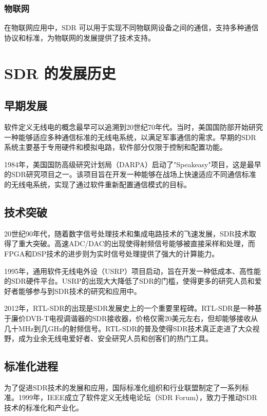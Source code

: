 ﻿\documentclass[UTF8]{ctexbook}
\begin{document}
\subsubsection{物联网}
在物联网应用中，SDR 可以用于实现不同物联网设备之间的通信，支持多种通信协议和标准，为物联网的发展提供了技术支持。
\section{SDR 的发展历史}

\subsection{早期发展}

软件定义无线电的概念最早可以追溯到20世纪70年代。当时，美国国防部开始研究一种能够适应多种通信标准的无线电系统，以满足军事通信的需求。早期的SDR系统主要基于专用硬件和模拟电路，软件部分仅限于控制和配置功能。

1984年，美国国防高级研究计划局（DARPA）启动了"Speakeasy"项目，这是最早的SDR研究项目之一。该项目旨在开发一种能够在战场上快速适应不同通信标准的无线电系统，实现了通过软件重新配置通信模式的目标。

\subsection{技术突破}

20世纪90年代，随着数字信号处理技术和集成电路技术的飞速发展，SDR技术取得了重大突破。高速ADC/DAC的出现使得射频信号能够被直接采样和处理，而FPGA和DSP技术的进步则为实时信号处理提供了强大的计算能力。

1995年，通用软件无线电外设（USRP）项目启动，旨在开发一种低成本、高性能的SDR硬件平台。USRP的出现大大降低了SDR的门槛，使得更多的研究人员和爱好者能够参与到SDR技术的研究和应用中。

2012年，RTL-SDR的出现是SDR发展史上的一个重要里程碑。RTL-SDR是一种基于廉价DVB-T电视调谐器的SDR接收器，价格仅需20美元左右，但却能够接收从几十MHz到几GHz的射频信号。RTL-SDR的普及使得SDR技术真正走进了大众视野，成为业余无线电爱好者、安全研究人员和创客们的热门工具。

\subsection{标准化进程}

为了促进SDR技术的发展和应用，国际标准化组织和行业联盟制定了一系列标准。1999年，IEEE成立了软件定义无线电论坛（SDR Forum），致力于推动SDR技术的标准化和产业化。
\end{document}
